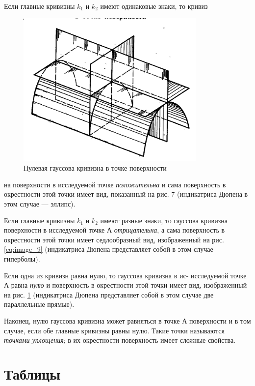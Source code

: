 \documentclass[a4paper,12pt]{article}
\begin{document}
    
    Если главные кривизны $k_1$ и $k_2$ имеют одинаковые знаки, то кривиз    
    \begin{figure}
        \includegraphics[width=\linewidth]{fig_10}
        \caption{Нулевая гауссова кривизна в точке
            поверхности}
        \label{eq:image_10}
    \end{figure} на поверхности в исследуемой точке \textit{положительна} и сама поверхность в окрестности этой точки имеет вид, показанный на рис. 7 (индикатриса Дюпена в этом случае — эллипс).
    
    Если главные кривизны $k_1$ и $k_2$ имеют разные знаки, то гауссова кривизна поверхности в исследуемой точке А \textit{отрицательна}, а сама поверхность в окрестности этой точки имеет седлообразный вид, изображенный на рис. \ref{eq:image_9} (индикатриса Дюпена представляет собой
    в этом случае гиперболы).
    
    Если одна из кривизн равна нулю, то гауссова кривизна в ис-
    исследуемой точке А равна \textit{нулю} и поверхность
    в окрестности этой точки имеет вид, изображенный на рис. \ref{eq:image_10} (индикатриса Дюпена представляет собой в этом случае две параллельные прямые).
    
    Наконец, нулю гауссова кривизна может равняться в точке А
    поверхности и в том случае, если обе главные кривизны равны
    нулю. Такие точки называются \textit{точками уплощения}; в их окрестности поверхность имеет сложные свойства.

	\section{Таблицы}
\end{document}

